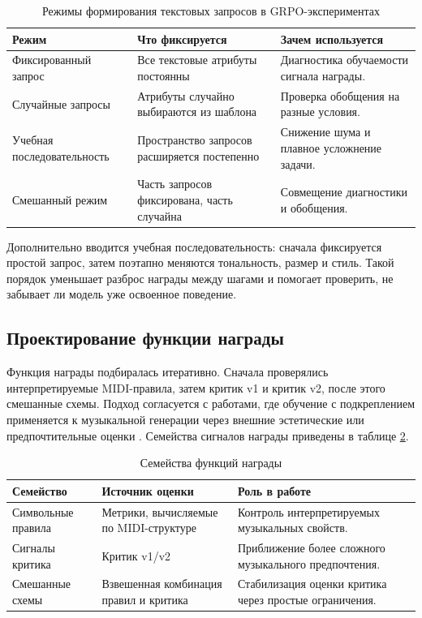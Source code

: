 \documentclass[a4paper,12pt]{extarticle}
\begin{document}
\begin{table}[ht]
\centering
\caption{Режимы формирования текстовых запросов в GRPO-экспериментах}
\label{tab:prompt_regimes}
\begin{tabular}{|p{}|p{}|p{}|}
\hline
\textbf{Режим} & \textbf{Что фиксируется} & \textbf{Зачем используется} \\
\hline
Фиксированный запрос & Все текстовые атрибуты постоянны & Диагностика обучаемости сигнала награды. \\
\hline
Случайные запросы & Атрибуты случайно выбираются из шаблона & Проверка обобщения на разные условия. \\
\hline
Учебная последовательность & Пространство запросов расширяется постепенно & Снижение шума и плавное усложнение задачи. \\
\hline
Смешанный режим & Часть запросов фиксирована, часть случайна & Совмещение диагностики и обобщения. \\
\hline
\end{tabular}
\end{table}

Дополнительно вводится учебная последовательность: сначала фиксируется простой
запрос, затем поэтапно меняются тональность, размер и стиль. Такой порядок
уменьшает разброс награды между шагами и помогает проверить, не
забывает ли модель уже освоенное поведение.

\subsection{Проектирование функции награды}

Функция награды подбиралась итеративно. Сначала проверялись
интерпретируемые MIDI-правила, затем критик v1 и критик v2, после этого
смешанные схемы. Подход согласуется с работами, где обучение с подкреплением
применяется к музыкальной генерации через внешние эстетические или
предпочтительные оценки \cite{rlduet2020,musicrl2024,smart2025}.
Семейства сигналов награды приведены в таблице \ref{tab:reward_families}.

\begin{table}[ht]
\centering
\caption{Семейства функций награды}
\label{tab:reward_families}
\begin{tabular}{|p{}|p{}|p{}|}
\hline
\textbf{Семейство} & \textbf{Источник оценки} & \textbf{Роль в работе} \\
\hline
Символьные правила & Метрики, вычисляемые по MIDI-структуре & Контроль интерпретируемых музыкальных свойств. \\
\hline
Сигналы критика & Критик v1/v2 & Приближение более сложного музыкального предпочтения. \\
\hline
Смешанные схемы & Взвешенная комбинация правил и критика & Стабилизация оценки критика через простые ограничения. \\
\hline
\end{tabular}
\end{table}
\end{document}
